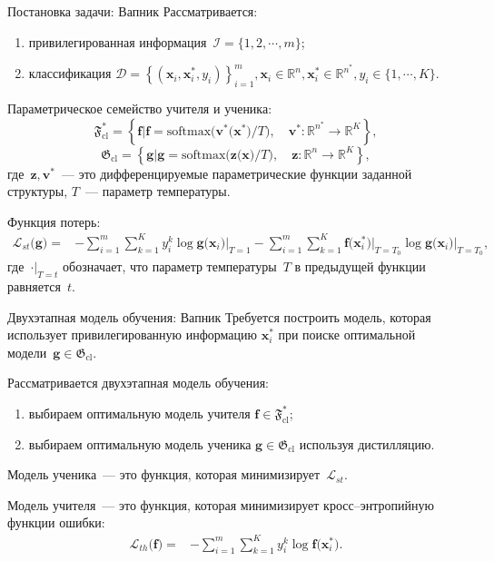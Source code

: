 \documentclass[9pt,pdf,hyperref={unicode}]{beamer}
\begin{document}
\begin{frame}{Постановка задачи: Вапник}
\justifying
Рассматривается:
\begin{enumerate}
	\item привилегированная информация~$\mathcal{I} = \{1, 2, \cdots, m\}$;
	\item классификация $\mathcal{D} = \left\{\left(\mathbf{x}_i, \mathbf{x}^*_i, y_i\right)\right\}_{i=1}^{m}, \mathbf{x}_i \in \mathbb{R}^{n}, \mathbf{x}^*_i \in \mathbb{R}^{n^*}, y_i \in \{1, \cdots, K\}$.
\end{enumerate}
Параметрическое семейство учителя и ученика:
\[
\mathfrak{F}_{\text{cl}}^* = \left\{\mathbf{f}| \mathbf{f} = \text{softmax}\bigr(\mathbf{v}^*\bigr(\mathbf{x}^*\bigr)/T\bigr), \quad \mathbf{v}^*: \mathbb{R}^{n^*} \to \mathbb{R}^K \right\},
\]
\[
\mathfrak{G}_{\text{cl}} = \left\{\mathbf{g}| \mathbf{g} = \text{softmax}\bigr(\mathbf{z}\bigr(\mathbf{x}\bigr)/T\bigr), \quad \mathbf{z}: \mathbb{R}^n \to \mathbb{R}^K \right\},
\]
где~$\mathbf{z},\mathbf{v}^*$~--- это дифференцируемые параметрические функции заданной структуры, $T$~--- параметр температуры.

Функция потерь:
\[
\begin{aligned}
   \mathcal{L}_{st}\bigr(\mathbf{g}\bigr) = &-\sum_{i=1}^{m}{\sum_{k=1}^{K}y^k_i\log\mathbf{g}\bigr(\mathbf{x}_i\bigr)\bigr|_{T=1}}-\sum_{i=1}^{m}{\sum_{k=1}^{K}\mathbf{f}\bigr(\mathbf{x}^*_i\bigr)\bigr|_{T=T_0}\log\mathbf{g}\bigr(\mathbf{x}_i\bigr)\bigr|_{T=T_0}},
\end{aligned}
\]
где~$\cdot\bigr|_{T=t}$ обозначает, что параметр температуры~$T$ в предыдущей функции равняется~$t$.

\end{frame}
\begin{frame}{Двухэтапная модель обучения: Вапник}
\justifying
Требуется построить модель, которая использует привилегированную информацию $\mathbf{x}^*_i$ при поиске оптимальной модели~$\mathbf{g} \in \mathfrak{G}_{\text{cl}}$.

Рассматривается двухэтапная модель обучения:
\begin{enumerate}
    \item выбираем оптимальную модель учителя $\mathbf{f} \in \mathfrak{F}_{\text{cl}}^*$;
    \item выбираем оптимальную модель ученика $\mathbf{g} \in \mathfrak{G}_{\text{cl}}$ используя дистилляцию. 
\end{enumerate}

Модель ученика~--- это функция, которая минимизирует~$\mathcal{L}_{st}$.

Модель учителя~--- это функция, которая минимизирует кросс--энтропийную функции ошибки:
\[
\begin{aligned}
   \mathcal{L}_{th}\bigr(\mathbf{f}\bigr) = &-\sum_{i=1}^{m}{{\sum_{k=1}^{K}y^k_i\log\mathbf{f}\bigr(\mathbf{x}^*_i\bigr)}}.
   \end{aligned}
\]
\end{frame}
\end{document}
